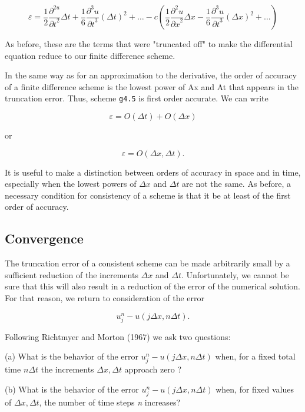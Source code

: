     {\[\varepsilon = \frac{1}{2}\frac{\partial^{2u}}{{\partial t}^{2}}\Delta t
+ \frac{1}{6}\frac{\partial^{3}u}{{\partial t}^{3}}\left( \Delta t \right)^{2} +\ldots-
c(\frac{1}{2}\frac{\partial^{2}u}{{\partial x}^{2}}\Delta x -
\frac{1}{6}\frac{\partial^{3}u}{{\partial t}^{3}}\left( \Delta x \right)^{2}
+\ldots )\]}

As before, these are the terms that were "truncated off" to make the
differential equation reduce to our finite difference scheme.

In the same way as for an approximation to the derivative, the order of
accuracy of a finite difference scheme is the lowest power of Ax and At
that appears in the truncation error. Thus, scheme \texttt{g4.5} is
first order accurate. We can write

\[\varepsilon = O \left( \Delta t \right) + O\left( \Delta x \right)\]

or

\[\varepsilon = O \left( \Delta x,\Delta t \right).\]

It is useful to make a distinction between orders of accuracy in space
and in time, especially when the lowest powers of \(\Delta x\) and
\(\Delta t\) are not the same. As before, a necessary condition for
consistency of a scheme is that it be at least of the first order of
accuracy.

\subsection{\texorpdfstring{\textbf{Convergence}}{Convergence}}\label{Section1.5}

The truncation error of a consistent scheme can be made arbitrarily
small by a sufficient reduction of the increments \(\Delta x\) and
\(\Delta t\). Unfortunately, we cannot be sure that this will also
result in a reduction of the error of the numerical solution. For that
reason, we return to consideration of the error

\[u_j^n-u\left( j\Delta x,n\Delta t \right).\]

Following Richtmyer and Morton (1967) we ask two questions:

(a) What is the behavior of the error
\(u_{j}^{n} - u\left( j\Delta x,n\Delta t \right)\) when, for a fixed
total time \(n \Delta t\) the increments \(\Delta x , \Delta t\)
approach zero ?

(b) What is the behavior of the error
\(u_{j}^{n} - u\left( j\Delta x,n\Delta t \right)\) when, for fixed
values of \(\Delta x, \Delta t\), the number of time steps \emph{n}
increases?

